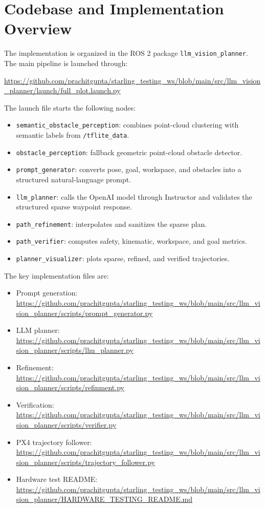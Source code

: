 \documentclass[11pt]{article}
\begin{document}
\section{Codebase and Implementation Overview}

The implementation is organized in the ROS 2 package \texttt{llm\_vision\_planner}. The main pipeline is launched through:

\begin{center}
\url{https://github.com/prachitgupta/starling_testing_ws/blob/main/src/llm_vision_planner/launch/full_plot.launch.py}
\end{center}

The launch file starts the following nodes:

\begin{itemize}
  \item \texttt{semantic\_obstacle\_perception}: combines point-cloud clustering with semantic labels from \texttt{/tflite\_data}.
  \item \texttt{obstacle\_perception}: fallback geometric point-cloud obstacle detector.
  \item \texttt{prompt\_generator}: converts pose, goal, workspace, and obstacles into a structured natural-language prompt.
  \item \texttt{llm\_planner}: calls the OpenAI model through Instructor and validates the structured sparse waypoint response.
  \item \texttt{path\_refinement}: interpolates and sanitizes the sparse plan.
  \item \texttt{path\_verifier}: computes safety, kinematic, workspace, and goal metrics.
  \item \texttt{planner\_visualizer}: plots sparse, refined, and verified trajectories.
\end{itemize}

The key implementation files are:

\begin{itemize}
  \item Prompt generation: \url{https://github.com/prachitgupta/starling_testing_ws/blob/main/src/llm_vision_planner/scripts/prompt_generator.py}
  \item LLM planner: \url{https://github.com/prachitgupta/starling_testing_ws/blob/main/src/llm_vision_planner/scripts/llm_planner.py}
  \item Refinement: \url{https://github.com/prachitgupta/starling_testing_ws/blob/main/src/llm_vision_planner/scripts/refinment.py}
  \item Verification: \url{https://github.com/prachitgupta/starling_testing_ws/blob/main/src/llm_vision_planner/scripts/verifier.py}
  \item PX4 trajectory follower: \url{https://github.com/prachitgupta/starling_testing_ws/blob/main/src/llm_vision_planner/scripts/trajectory_follower.py}
  \item Hardware test README: \url{https://github.com/prachitgupta/starling_testing_ws/blob/main/src/llm_vision_planner/HARDWARE_TESTING_README.md}
\end{itemize}
\end{document}
